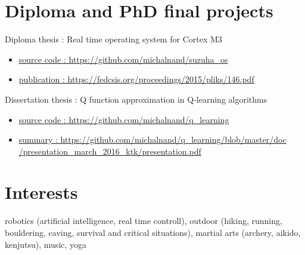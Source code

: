 \documentclass[10pt]{article}
\begin{document}
\section*{Diploma and PhD final projects}
Diploma thesis : Real time operating system for Cortex M3
\begin{itemize}
\item \href{https://github.com/michalnand/suzuha\_os}{source code : https://github.com/michalnand/suzuha\_os}
\item \href{https://fedcsis.org/proceedings/2015/pliks/146.pdf}{publication : https://fedcsis.org/proceedings/2015/pliks/146.pdf}
\end{itemize}
Dissertation thesis : Q function approximation in Q-learning algorithms
\begin{itemize}
\item \href{https://github.com/michalnand/q\_learning}{source code : https://github.com/michalnand/q\_learning}
\item \href{https://github.com/michalnand/q\_learning/blob/master/doc/presentation\_march\_2016\_ktk/presentation.pdf}{summary : https://github.com/michalnand/q\_learning/blob/master/doc\\
                  /presentation\_march\_2016\_ktk/presentation.pdf}
\end{itemize}

\section*{Interests}
robotics (artificial intelligence, real time controll),
outdoor (hiking, running, bouldering, caving, survival and critical situations),
martial arts (archery, aikido, kenjutsu), music, yoga
\end{document}
